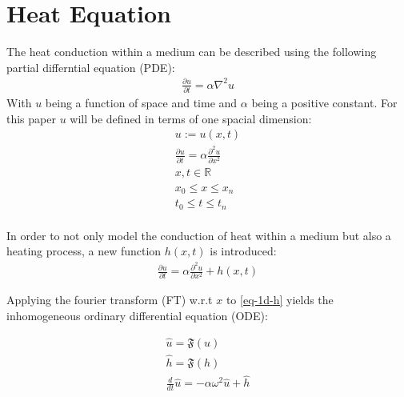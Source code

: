 \section{Heat Equation}
The heat conduction within a medium can be described using the following partial differntial equation (PDE):
\begin{gather}
\frac{\partial u}{\partial t} = \alpha \nabla^{2} u
\end{gather}
With \(u\) being a function of space and time and \(\alpha\) being a positive constant.
For this paper \(u\) will be defined in terms of one spacial dimension:
\begin{gather}
u := u(x, t) \\
\frac{\partial u}{\partial t} = \alpha \frac{\partial^{2} u}{\partial x^{2}} \\
x, t \in \mathbb{R} \\
x_{0} \leq x \leq x_{n} \\
t_{0} \leq t \leq t_{n} \\
\end{gather}
\cite{Gustafsson2011}

In order to not only model the conduction of heat within a medium but also a heating process, a new function \(h(x, t)\) is introduced:
\begin{gather}
\frac{\partial u}{\partial t} = \alpha \frac{\partial^{2} u}{\partial x^{2}} + h(x,t) \label{eq-1d-h}
\end{gather}

Applying the fourier transform (FT) w.r.t \(x\) to \ref{eq-1d-h} yields the inhomogeneous ordinary differential equation (ODE):

\begin{gather}
\hat{u} = \mathfrak{F}(u) \\
\hat{h} = \mathfrak{F}(h) \\
\frac{d}{dt} \hat{u} = -\alpha\omega^{2}\hat{u} + \hat{h} \label{eq-1d-h-ft}
\end{gather}

